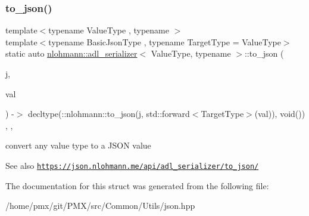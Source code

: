 \subsubsection{\texorpdfstring{to\+\_\+json()}{to\_json()}}
{\footnotesize\ttfamily template$<$typename Value\+Type , typename $>$ \\
template$<$typename Basic\+Json\+Type , typename Target\+Type  = Value\+Type$>$ \\
static auto \hyperlink{structnlohmann_1_1adl__serializer}{nlohmann\+::adl\+\_\+serializer}$<$ Value\+Type, typename $>$\+::to\+\_\+json (\begin{DoxyParamCaption}\item[{Basic\+Json\+Type \&}]{j,  }\item[{Target\+Type \&\&}]{val }\end{DoxyParamCaption}) -\/$>$ decltype(\+::nlohmann\+::to\+\_\+json(j, std\+::forward$<$Target\+Type$>$(val)), void())
    \hspace{0.3cm}{\ttfamily [inline]}, {\ttfamily [static]}, {\ttfamily [noexcept]}}



convert any value type to a J\+S\+ON value 

\begin{DoxySeeAlso}{See also}
\href{https://json.nlohmann.me/api/adl_serializer/to_json/}{\tt https\+://json.\+nlohmann.\+me/api/adl\+\_\+serializer/to\+\_\+json/} 
\end{DoxySeeAlso}


The documentation for this struct was generated from the following file\+:\begin{DoxyCompactItemize}
\item 
/home/pmx/git/\+P\+M\+X/src/\+Common/\+Utils/json.\+hpp\end{DoxyCompactItemize}
